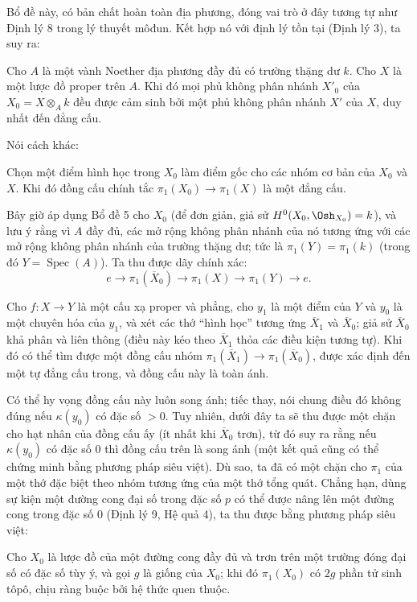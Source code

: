 Bổ đề này, có bản chất hoàn toàn địa phương, đóng vai trò ở đây tương tự như
Định lý 8 trong lý thuyết môđun. Kết hợp nó với định lý tồn tại (Định lý 3),
ta suy ra:

 Cho $A$ là một vành Noether địa phương đầy đủ có trường
thặng dư $k$. Cho $X$ là một lược đồ proper trên $A$. Khi đó mọi phủ không
phân nhánh $X'_0$ của $X_0=X\otimes_A k$ đều được cảm sinh bởi một phủ không
phân nhánh $X'$ của $X$, duy nhất đến đẳng cấu.

Nói cách khác:

 Chọn một điểm hình học trong $X_0$ làm điểm gốc cho các
nhóm cơ bản của $X_0$ và $X$. Khi đó đồng cấu chính tắc
$\pi_1(X_0)\longrightarrow\pi_1(X)$ là một đẳng cấu.

Bây giờ áp dụng Bổ đề 5 cho $X_0$ (để đơn giản, giả sử
$H^0(X_0,\Osh_{X_0})=k$), và lưu ý rằng vì $A$ đầy đủ, các mở rộng không phân
nhánh của nó tương ứng với các mở rộng không phân nhánh của trường thặng dư;
tức là $\pi_1(Y)=\pi_1(k)$ (trong đó $Y=\operatorname{Spec}(A)$). Ta thu được
dãy chính xác:
\[
  e\longrightarrow\pi_1(\overline X_0)
  \longrightarrow\pi_1(X)\longrightarrow\pi_1(Y)\longrightarrow e.
\]

 Cho $f:X\longrightarrow Y$ là một cấu xạ proper và phẳng,
cho $y_1$ là một điểm của $Y$ và $y_0$ là một chuyên hóa của $y_1$, và xét các
thớ “hình học” tương ứng $\overline X_1$ và $\overline X_0$; giả sử
$\overline X_0$ khả phân và liên thông (điều này kéo theo
$\overline X_1$ thỏa các điều kiện tương tự). Khi đó có thể tìm được một đồng
cấu nhóm
$\pi_1(\overline X_1)\longrightarrow\pi_1(\overline X_0)$, được xác định đến
một tự đẳng cấu trong, và đồng cấu này là toàn ánh.


Có thể hy vọng đồng cấu này luôn song ánh; tiếc thay, nói chung điều đó không
đúng nếu $\kappa(y_0)$ có đặc số $>0$. Tuy nhiên, dưới đây ta sẽ thu được một
chặn cho hạt nhân của đồng cấu ấy (ít nhất khi $\overline X_0$ trơn), từ đó suy
ra rằng nếu $\kappa(y_0)$ có đặc số $0$ thì đồng cấu trên là song ánh (một kết
quả cũng có thể chứng minh bằng phương pháp siêu việt). Dù sao, ta đã có một
chặn cho $\pi_1$ của một thớ đặc biệt theo nhóm tương ứng của một thớ tổng quát.
Chẳng hạn, dùng sự kiện một đường cong đại số trong đặc số $p$ có thể được nâng
lên một đường cong trong đặc số $0$ (Định lý 9, Hệ quả 4), ta thu được bằng
phương pháp siêu việt:

 Cho $X_0$ là lược đồ của một đường cong đầy đủ và trơn trên
một trường đóng đại số có đặc số tùy ý, và gọi $g$ là giống của $X_0$; khi đó
$\pi_1(X_0)$ có $2g$ phần tử sinh tôpô, chịu ràng buộc bởi hệ thức quen thuộc.

